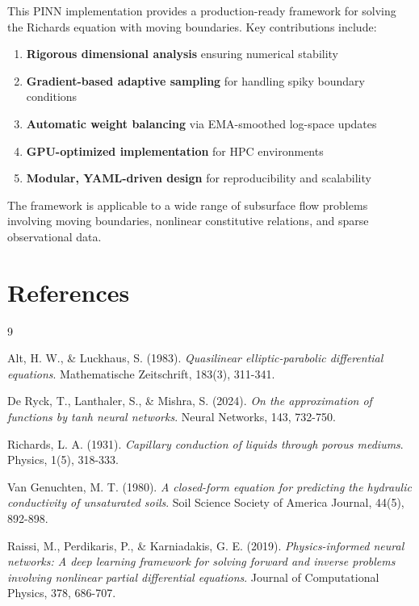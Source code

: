 \documentclass[11pt,a4paper]{article}
\begin{document}
This PINN implementation provides a production-ready framework for solving the Richards equation with moving boundaries. Key contributions include:

\begin{enumerate}
    \item \textbf{Rigorous dimensional analysis} ensuring numerical stability
    \item \textbf{Gradient-based adaptive sampling} for handling spiky boundary conditions
    \item \textbf{Automatic weight balancing} via EMA-smoothed log-space updates
    \item \textbf{GPU-optimized implementation} for HPC environments
    \item \textbf{Modular, YAML-driven design} for reproducibility and scalability
\end{enumerate}

The framework is applicable to a wide range of subsurface flow problems involving moving boundaries, nonlinear constitutive relations, and sparse observational data.

\section*{References}

\begin{thebibliography}{9}

Alt, H. W., \& Luckhaus, S. (1983).
\textit{Quasilinear elliptic-parabolic differential equations}.
Mathematische Zeitschrift, 183(3), 311-341.

De Ryck, T., Lanthaler, S., \& Mishra, S. (2024).
\textit{On the approximation of functions by tanh neural networks}.
Neural Networks, 143, 732-750.

Richards, L. A. (1931).
\textit{Capillary conduction of liquids through porous mediums}.
Physics, 1(5), 318-333.

Van Genuchten, M. T. (1980).
\textit{A closed-form equation for predicting the hydraulic conductivity of unsaturated soils}.
Soil Science Society of America Journal, 44(5), 892-898.

Raissi, M., Perdikaris, P., \& Karniadakis, G. E. (2019).
\textit{Physics-informed neural networks: A deep learning framework for solving forward and inverse problems involving nonlinear partial differential equations}.
Journal of Computational Physics, 378, 686-707.

\end{thebibliography}
\end{document}
